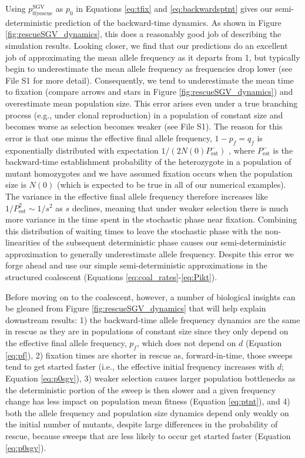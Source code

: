 \documentclass[]{article}
\begin{document}
Using $p_{0|\mathrm{rescue}}^\mathrm{SGV}$ as $p_0$ in Equations \ref{eq:tfix} and \ref{eq:backwardsptnt} gives our semi-deterministic prediction of the backward-time dynamics.
As shown in Figure \ref{fig:rescueSGV_dynamics}, this does a reasonably good job of describing the simulation results.
Looking closer, we find that our predictions do an excellent job of approximating the mean allele frequency as it departs from 1, but typically begin to underestimate the mean allele frequency as frequencies drop lower (see File S1 for more detail).
Consequently, we tend to underestimate the mean time to fixation (compare arrows and stars in Figure \ref{fig:rescueSGV_dynamics}) and overestimate mean population size.
This error arises even under a true branching process (e.g., under clonal reproduction) in a population of constant size and becomes worse as selection becomes weaker (see File S1).
The reason for this error is that one minus the effective final allele frequency, $1-p_f = q_f$ is exponentially distributed with expectation $1/(2N(0)P_\mathrm{est}^-)$ \citep{martin2015simple}, where $P_\mathrm{est}^-$ is the backward-time establishment probability of the heterozygote in a population of mutant homozygotes and we have assumed fixation occurs when the population size is $N(0)$ (which is expected to be true in all of our numerical examples).  
The variance in the effective final allele frequency therefore increases like $1/P_\mathrm{est}^2 \sim 1/s^2$ as $s$ declines, meaning that under weaker selection there is much more variance in the time spent in the stochastic phase near fixation.
Combining this distribution of waiting times to leave the stochastic phase with the non-linearities of the subsequent deterministic phase causes our semi-deterministic approximation to generally underestimate allele frequency.
Despite this error we forge ahead and use our simple semi-deterministic approximations in the structured coalescent (Equations \ref{eq:coal_rates}-\ref{eq:Pikt}).

Before moving on to the coalescent, however, a number of biological insights can be gleaned from Figure \ref{fig:rescueSGV_dynamics} that will help explain downstream results:
1) the backward-time allele frequency dynamics are the same in rescue as they are in populations of constant size since they only depend on the effective final allele frequency, $p_f$, which does not depend on $d$ (Equation \ref{eq:pf}),
2) fixation times are shorter in rescue as, forward-in-time, those sweeps tend to get started faster (i.e., the effective initial frequency increases with $d$; Equation \ref{eq:p0sgv}),
3) weaker selection causes larger population bottlenecks as the deterministic portion of the sweep is then slower and a given frequency change has less impact on population mean fitness (Equation \ref{eq:ptnt}), and
4) both the allele frequency and population size dynamics depend only weakly on the initial number of mutants, despite large differences in the probability of rescue, because sweeps that are less likely to occur get started faster (Equation \ref{eq:p0sgv}).
\end{document}
